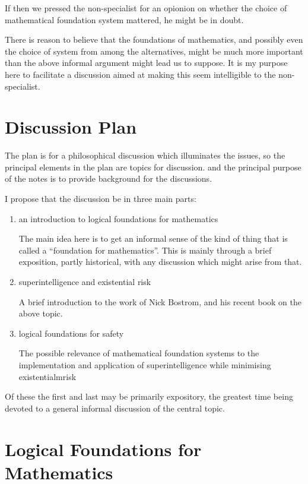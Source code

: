 \documentclass[12pt,titlepage]{article}
\begin{document}
If then we pressed the non-specialist for an opionion on whether the choice of mathematical foundation system mattered, he might be in doubt.

There is reason to believe that the foundations of mathematics, and possibly even the choice of system from among the alternatives, might be much more important than the above informal argument might lead us to suppose.
It is my purpose here to facilitate a discussion aimed at making this seem intelligible to the non-specialist.

\section{Discussion Plan}

The plan is for a philosophical discussion which illuminates the issues, so the principal elements in the plan are topics for discussion. and the principal purpose of the notes is to provide background for the discussions.

I propose that the discussion be in three main parts:

\begin{enumerate}
\item an introduction to logical foundations for mathematics

The main idea here is to get an informal sense of the kind of thing that is called a ``foundation for mathematics''.
This is mainly through a brief exposition, partly historical, with any discussion which might arise from that.

\item superintelligence and existential risk

A brief introduction to the work of Nick Bostrom, and his recent book on the above topic.

\item logical foundations for safety

The possible relevance of mathematical foundation systems to the implementation and application of superintelligence while minimising existentialmrisk

\end{enumerate}

Of these the first and last may be primarily expository, the greatest time being devoted to a general informal discussion of the central topic.

\section{Logical Foundations for Mathematics}
\end{document}
